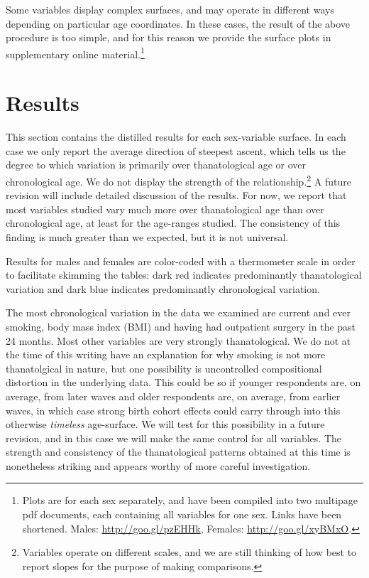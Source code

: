 \documentclass{article}
\begin{document}
Some variables display complex surfaces, and may operate in different ways
depending on particular age coordinates. In these cases, the result of the above
procedure is too simple, and for this reason we provide the surface plots in supplementary online
material.\footnote{Plots are for each sex separately, and have been compiled
into two multipage pdf documents, each containing all variables for one sex.
Links have been shortened.
Males:
\url{http://goo.gl/pzEHHk}, Females:
\url{http://goo.gl/xyBMxO}.}



\section*{Results}
This section contains the distilled results for each sex-variable surface. In
each case we only report the average direction of steepest ascent, which tells
us the degree to which variation is primarily over thanatological age or over
chronological age. We do not display the strength of the
relationship.\footnote{Variables operate on different scales, and we are still
thinking of how best to report slopes for the purpose of making comparisons. }
A future revision will include detailed discussion of the results. For now, we
report that most variables studied vary much more over thanatological age
than over chronological age, at least for the age-ranges studied. The
consistency of this finding is much greater than we expected, but it is not
universal. 

Results for males and females are color-coded with a thermometer scale in order
to facilitate skimming the tables: dark red indicates
predominantly thanatological variation and dark blue indicates
predominantly chronological variation.

The most chronological variation in the data we examined are current and ever
smoking, body mass index (BMI) and having had outpatient surgery in the past 24
months. Most other variables are very strongly thanatological. We do not at the
time of this writing have an explanation for why smoking is not more
thanatolgical in nature, but one possibility is uncontrolled compositional
distortion in the underlying data. This could be so if younger respondents are,
on average, from later waves and older respondents are, on average, from earlier
waves, in which case strong birth cohort effects could carry through into this
otherwise \textit{timeless} age-surface. We will test for this possibility in a future
revision, and in this case we will make the same control for all variables. The
strength and consistency of the thanatological patterns obtained at this time is
nonetheless striking and appears worthy of more careful
investigation.
\end{document}
